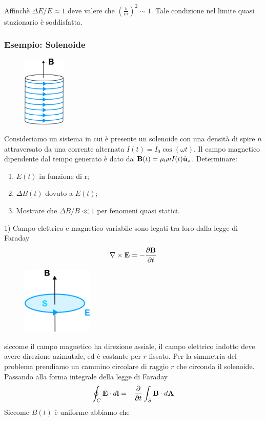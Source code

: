 Affinch\`e $\Delta E/E \approx1$ deve valere che $\left(\frac{b}{c \tau}\right)^2 \sim 1$. Tale condizione nel limite quasi stazionario \`e soddisfatta.

\subsubsection{Esempio: Solenoide }
\begin{figure} %
    \centering
    \includegraphics[width=0.18\textwidth]{images/solenoid2} %
\end{figure}
Consideriamo un sistema in cui \`e presente un solenoide con una densit\`a di spire $n$ attraversato da una corrente alternata $I(t) = I_0 \cos(\omega t)$. Il campo magnetico dipendente dal tempo generato \`e dato da $\bold{B}(t) = \mu_0 n I(t) \hat{\bold{u}}_z$. Determinare:
\begin{enumerate}
	\item  $E(t)$ in funzione di r;
	\item $\Delta B(t)$ dovuto a $E(t)$;
	\item Mostrare che $\Delta B /B \ll 1$ per fenomeni quasi statici.
\end{enumerate}



1)  Campo elettrico e magnetico variabile sono legati tra loro dalla legge di Faraday
\begin{equation*}
	\nabla \times \bold{E} = - \frac{\partial \bold{B}}{\partial t}
\end{equation*}
\begin{figure} %
    \centering
    \includegraphics[width=0.3\textwidth]{images/circular_path} %
\end{figure}
siccome il campo magnetico ha direzione assiale, il campo elettrico indotto deve avere direzione azimutale, ed \`e costante per $r$ fissato. Per la simmetria del problema prendiamo un cammino circolare di raggio $r$ che circonda il solenoide. Passando alla forma integrale della legge di Faraday
\begin{equation*}
	\oint_{C} \bold{E} \cdot d \bold{l} = - \frac{\partial}{\partial t} \int_{S} \bold{B} \cdot d\bold{A}
\end{equation*} 
Siccome $B(t)$ \`e uniforme abbiamo che 

